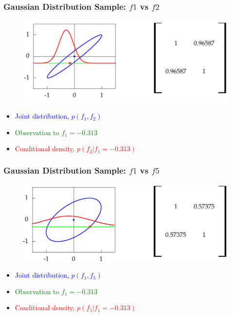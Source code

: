 \documentclass[10pt]{beamer}
\begin{document}
  \begin{frame}[noframenumbering]
    \frametitle{Gaussian Distribution Sample: $f1$ vs $f2$}

    \begin{figure}
      \centering
      \includegraphics[width=\textwidth]{covariance1.png}
    \end{figure}

    \begin{itemize}
      \item \textcolor{blue}{Joint distribution, $p(f_1,f_2)$}
      \item \textcolor{green}{Observation to $f_1 = -0.313$}
      \item \textcolor{red}{Conditional density, $p(f_2|f_1 = -0.313)$}
    \end{itemize}
  \end{frame}

  \begin{frame}[noframenumbering]
    \frametitle{Gaussian Distribution Sample: $f1$ vs $f5$}

    \begin{figure}
      \centering
      \includegraphics[width=\textwidth]{covariance2.png}
    \end{figure}

    \begin{itemize}
      \item \textcolor{blue}{Joint distribution, $p(f_1,f_5)$}
      \item \textcolor{green}{Observation to $f_1 = -0.313$}
      \item \textcolor{red}{Conditional density, $p(f_5|f_1 = -0.313)$}
    \end{itemize}
  \end{frame}
\end{document}

